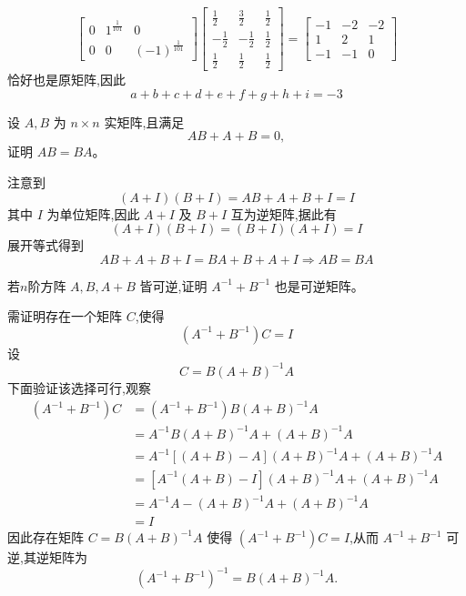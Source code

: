 \begin{questions}
\begin{solution}
\[\begin{bmatrix}
        0 & 1^{\frac{1}{101}} & 0 \\
        0 & 0 & (-1)^{\frac{1}{101}}
        \end{bmatrix}
        \begin{bmatrix}
        \frac{1}{2} & \frac{3}{2} & \frac{1}{2} \\
        -\frac{1}{2} & -\frac{1}{2} & \frac{1}{2} \\
        \frac{1}{2} & \frac{1}{2} & \frac{1}{2}
        \end{bmatrix}
        =
        \begin{bmatrix}
        -1 & -2 & -2 \\
        1 & 2 & 1 \\
        -1 & -1 & 0
        \end{bmatrix}
        \]
        恰好也是原矩阵,因此
        \[
        a + b + c + d + e + f + g + h + i = -3
        \]
    \end{solution}

    \question 设 $A,B$ 为 $n\times n$ 实矩阵,且满足
    \[
    AB + A + B = 0,
    \]
    证明 $AB = BA$。
    \begin{solution}
        注意到
        \[
        (A+I)(B+I) = AB + A + B + I = I
        \]
        其中 $I$ 为单位矩阵,因此 $A+I$ 及 $B+I$ 互为逆矩阵,据此有
        \[
        (A+I)(B+I) = (B+I)(A+I) = I
        \]
        展开等式得到
        \[
        AB + A + B + I = BA + B + A + I \Rightarrow AB = BA
        \]
    \end{solution}

    \question 若$n$阶方阵 $A,B,A+B$ 皆可逆,证明 $A^{-1}+B^{-1}$ 也是可逆矩阵。
    \begin{solution}
        需证明存在一个矩阵 $C$,使得
        \[
        (A^{-1}+B^{-1})C=I
        \]
        设
        \[
        C=B(A+B)^{-1}A
        \]
        下面验证该选择可行,观察
        \begin{align*}
        (A^{-1}+B^{-1})C
        &=(A^{-1}+B^{-1})B(A+B)^{-1}A \\
        &=A^{-1}B(A+B)^{-1}A+(A+B)^{-1}A \\
        &=A^{-1}[(A+B)-A](A+B)^{-1}A+(A+B)^{-1}A \\
        &=[A^{-1}(A+B)-I](A+B)^{-1}A+(A+B)^{-1}A \\
        &=A^{-1}A-(A+B)^{-1}A+(A+B)^{-1}A \\
        &=I
        \end{align*}
        因此存在矩阵 $C=B(A+B)^{-1}A$ 使得 $(A^{-1}+B^{-1})C=I$,从而 $A^{-1}+B^{-1}$ 可逆,其逆矩阵为
        \[
        (A^{-1}+B^{-1})^{-1}=B(A+B)^{-1}A.
        \]
    \end{solution}


\end{questions}

